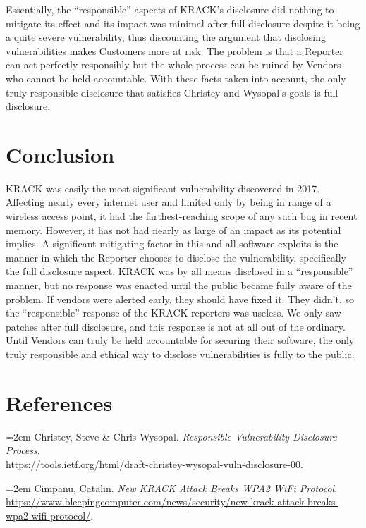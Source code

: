 \documentclass[12pt]{article}
\begin{document}
\begin{doublespace}
Essentially, the ``responsible'' aspects of KRACK's disclosure did nothing to
mitigate its effect and its impact was minimal after full disclosure despite it
being a quite severe vulnerability, thus discounting the argument that
disclosing vulnerabilities makes Customers more at risk. The problem is that a
Reporter can act perfectly
responsibly but the whole process can be ruined by Vendors who cannot be held
accountable. With these facts taken into account, the only truly responsible
disclosure that satisfies Christey and Wysopal's goals is full disclosure.

\section*{Conclusion}
KRACK was easily the most significant vulnerability discovered in 2017.
Affecting nearly every internet user and limited only by being in range of a
wireless access point, it had the farthest-reaching scope of any such bug in
recent memory. However, it has not had nearly as large of an impact as its
potential implies. A significant mitigating factor in this and all software
exploits is the manner in which the Reporter chooses to disclose the
vulnerability, specifically the full disclosure aspect. KRACK was by all means
disclosed in a ``responsible'' manner,
but no response was enacted until the public became fully aware of the
problem. If vendors were alerted early, they should
have fixed it. They didn't, so the ``responsible'' response of the KRACK
reporters was useless. We only saw patches after full
disclosure, and this response is not at all out of the ordinary. Until
Vendors can truly be held accountable for securing their software, the only
truly responsible and ethical way to disclose vulnerabilities is fully to
the public.

\end{doublespace}
\newpage
\section*{\hfil References \hfil}
\noindent \hangindent=2em
Christey, Steve \& Chris Wysopal.
\textit{Responsible Vulnerability Disclosure Process}. \\
\url{https://tools.ietf.org/html/draft-christey-wysopal-vuln-disclosure-00}.

\noindent \hangindent=2em
Cimpanu, Catalin.
\textit{New KRACK Attack Breaks WPA2 WiFi Protocol}. \\
\url{https://www.bleepingcomputer.com/news/security/new-krack-attack-breaks-wpa2-wifi-protocol/}.
\end{document}
